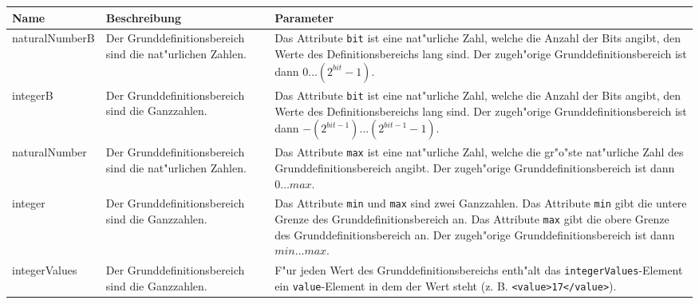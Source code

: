 \begin{center}
\begin{longtable}{|p{25mm}|p{25mm}|p{75mm}|}\hline
	Name & Beschreibung & Parameter \\\hline\endhead
	naturalNumberB & Der Grunddefinitionsbereich sind die nat"urlichen Zahlen. & Das Attribute \verb|bit| ist eine nat"urliche Zahl, welche die Anzahl der Bits angibt, den Werte des Definitionsbereichs lang sind. Der zugeh"orige Grunddefinitionsbereich ist dann $0 \ldots (2^{bit}-1)$. \\\hline
	integerB & Der Grunddefinitionsbereich sind die Ganzzahlen. & Das Attribute \verb|bit| ist eine nat"urliche Zahl, welche die Anzahl der Bits angibt, den Werte des Definitionsbereichs lang sind. Der zugeh"orige Grunddefinitionsbereich ist dann $-(2^{bit-1}) \ldots (2^{bit-1}-1)$. \\\hline
	naturalNumber &  Der Grunddefinitionsbereich sind die nat"urlichen Zahlen. & Das Attribute \verb|max| ist eine nat"urliche Zahl, welche die gr"o"ste nat"urliche Zahl des Grunddefinitionsbereich angibt. Der zugeh"orige Grunddefinitionsbereich ist dann $0 \ldots max$.\\\hline
	integer & Der Grunddefinitionsbereich sind die Ganzzahlen. &  Das Attribute \verb|min| und \verb|max| sind zwei Ganzzahlen. Das Attribute \verb|min| gibt die untere Grenze des Grunddefinitionsbereich an. Das Attribute \verb|max| gibt die obere Grenze des Grunddefinitionsbereich an. Der zugeh"orige Grunddefinitionsbereich ist dann $min \ldots max$.\\\hline
	integerValues & Der Grunddefinitionsbereich sind die Ganzzahlen. & F"ur jeden Wert des Grunddefinitionsbereichs enth"alt das \verb|integerValues|-Element ein \verb|value|-Element in dem der Wert steht (z. B. \verb|<value>17</value>|).\\\hline


\end{longtable}
\end{center}

